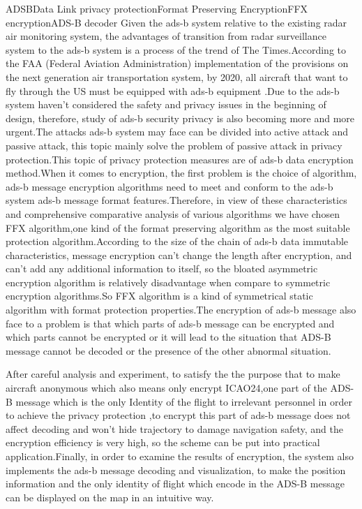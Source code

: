 
\begin{Eabstract}{ADSB}{Data Link privacy protection}{Format Preserving Encryption}{FFX encryption}{ADS-B decoder}
Given the ads-b system relative to the existing radar air monitoring system, the advantages of transition from radar surveillance system to the ads-b system is a process of the trend of The Times.According to the FAA (Federal Aviation Administration) implementation of the provisions on the next generation air transportation system, by 2020, all aircraft that want to fly through the US must be equipped with ads-b equipment .Due to the ads-b system haven't considered the safety and privacy issues in the beginning of design, therefore, study of ads-b security privacy is also becoming more and more urgent.The attacks ads-b system may face can be divided into active attack and passive attack, this topic mainly solve the problem of passive attack in privacy protection.This topic of privacy protection measures are of ads-b data encryption method.When it comes to encryption, the first problem is the choice of algorithm, ads-b message encryption algorithms need to meet and conform to the ads-b system ads-b message format features.Therefore, in view of these characteristics and comprehensive comparative analysis of various algorithms we have chosen FFX algorithm,one kind of the format preserving algorithm as the most suitable protection algorithm.According to the size of the chain of ads-b data immutable characteristics, message encryption can't change the length after encryption, and can't add any additional information to itself, so the bloated  asymmetric encryption algorithm is relatively disadvantage when compare to symmetric encryption algorithms.So FFX algorithm is a kind of symmetrical static algorithm with format protection properties.The encryption of ads-b message also face to a problem is that which parts of ads-b message can be encrypted and which parts cannot be encrypted or it will lead to the situation that ADS-B message cannot be decoded or the presence of the other abnormal situation.

After careful analysis and experiment, to satisfy the the purpose that to make aircraft anonymous which also means only encrypt ICAO24,one part of the ADS-B message which is the only Identity of the flight to irrelevant personnel in order to achieve the privacy protection ,to encrypt this part of ads-b message does not affect decoding and won't hide trajectory to damage navigation safety, and the encryption efficiency is very high, so the scheme can be put into practical application.Finally, in order to examine the results of encryption, the system also implements the ads-b message decoding and visualization, to make the position information and the only identity of flight which encode in the ADS-B message can be displayed on the map in an intuitive way.
\end{Eabstract}
